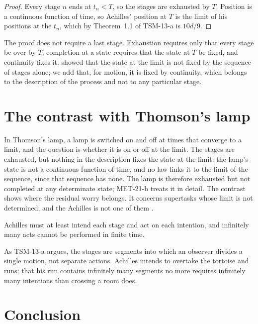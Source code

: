 \documentclass{situationist-preprint}
\begin{document}
\begin{proof}
Every stage $n$ ends at $t_n < T$, so the stages are exhausted by $T$. Position is a continuous function of time, so Achilles' position at $T$ is the limit of his positions at the $t_n$, which by Theorem~1.1 of TSM-13-a is $10d/9$.
\end{proof}

The proof does not require a last stage. Exhaustion requires only that every stage be over by $T$; completion at a state requires that the state at $T$ be fixed, and continuity fixes it. \citet{Benacerraf1962} showed that the state at the limit is not fixed by the sequence of stages alone; we add that, for motion, it is fixed by continuity, which belongs to the description of the process and not to any particular stage.

\section{The contrast with Thomson's lamp}

In Thomson's lamp, a lamp is switched on and off at times that converge to a limit, and the question is whether it is on or off at the limit. The stages are exhausted, but nothing in the description fixes the state at the limit: the lamp's state is not a continuous function of time, and no law links it to the limit of the sequence, since that sequence has none. The lamp is therefore exhausted but not completed at any determinate state; MET-21-b treats it in detail. The contrast shows where the residual worry belongs. It concerns supertasks whose limit is not determined, and the Achilles is not one of them \citep{EarmanNorton1996}.

\begin{objection}
Achilles must at least intend each stage and act on each intention, and infinitely many acts cannot be performed in finite time.
\end{objection}

\begin{reply}
As TSM-13-a argues, the stages are segments into which an observer divides a single motion, not separate actions. Achilles intends to overtake the tortoise and runs; that his run contains infinitely many segments no more requires infinitely many intentions than crossing a room does.
\end{reply}

\section{Conclusion}
\end{document}
